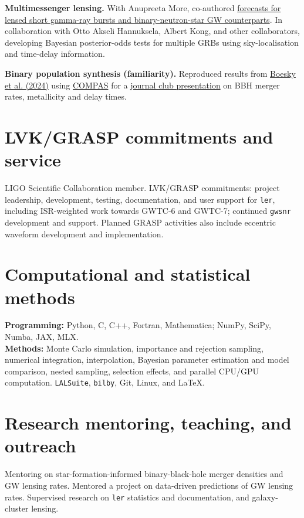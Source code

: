 \documentclass[11pt]{article}
\begin{document}
\textbf{Multimessenger lensing.} With Anupreeta More, co-authored \href{https://arxiv.org/abs/2502.02536}{forecasts for lensed short gamma-ray bursts and binary-neutron-star GW counterparts}. In collaboration with Otto Akseli Hannuksela, Albert Kong, and other collaborators, developing Bayesian posterior-odds tests for multiple GRBs using sky-localisation and time-delay information.

\textbf{Binary population synthesis (familiarity).} Reproduced results from \href{https://arxiv.org/abs/2405.01623}{Boesky et al. (2024)} using \href{https://compas.science/}{COMPAS} for a \href{https://docs.google.com/presentation/d/1WBn-nu949xdn9oGZe1GgIlbHsQ_ZBelahJA6aSFyVq0/edit}{journal club presentation} on BBH merger rates, metallicity and delay times.
\section*{LVK/GRASP commitments and service}
LIGO Scientific Collaboration member. LVK/GRASP commitments: project leadership, development, testing, documentation, and user support for \texttt{ler}, including ISR-weighted work towards GWTC-6 and GWTC-7; continued \texttt{gwsnr} development and support. Planned GRASP activities also include eccentric waveform development and implementation.
\newpage
\section*{Computational and statistical methods}
\textbf{Programming:} Python, C, C++, Fortran, Mathematica; NumPy, SciPy, Numba, JAX, MLX.\\
\textbf{Methods:} Monte Carlo simulation, importance and rejection sampling, numerical integration, interpolation, Bayesian parameter estimation and model comparison, nested sampling, selection effects, and parallel CPU/GPU computation. \texttt{LALSuite}, \texttt{bilby}, Git, Linux, and \LaTeX.
\section*{Research mentoring, teaching, and outreach}
Mentoring on star-formation-informed binary-black-hole merger densities and GW lensing rates.
Mentored a project on data-driven predictions of GW lensing rates.
Supervised research on \texttt{ler} statistics and documentation, and galaxy-cluster lensing.
\end{document}
